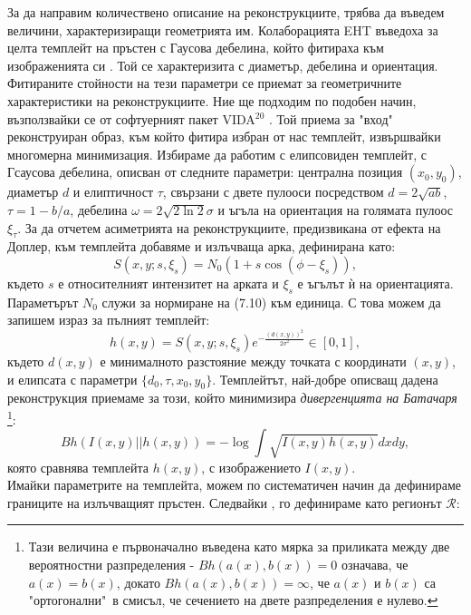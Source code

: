 За да направим количествено описание на реконструкциите, трябва да въведем величини, характеризиращи геометрията им. Колаборацията EHT въведоха за целта темплейт на пръстен с Гаусова дебелина, който фитираха към изображенията си \cite{EHT_M87_VI}. Той се характеризита с диаметър, дебелина и ориентация. Фитираните стойности на тези параметри се приемат за геометричните характеристики на реконструкциите. Ние ще подходим по подобен начин, възползвайки се от софтуерният пакет VIDA$^{20}$ \cite{VIDA}. Той приема за "вход"$\,$ реконструиран образ, към който фитира избран от нас темплейт, извършвайки многомерна минимизация. Избираме да работим с елипсовиден темплейт, с Гсаусова дебелина, описван от следните параметри: централна позиция $(x_0,y_0)$, диаметър $d$ и елиптичност $\tau$, свързани с двете пулооси посредством $d = 2\sqrt{ab}$, $\tau = 1 - b/a$, дебелина $\mathcal{\omega} = 2\sqrt{2\ln2}\sigma$ и ъгъла на ориентация на голямата пулоос $\xi_\tau$. За да отчетем асиметрията на реконструкциите, предизвикана от ефекта на Доплер, към темплейта добавяме и излъчваща арка, дефинирана като:
\begin{equation}
	S(x,y;s,\xi_s) = N_0(1 + s\cos(\phi - \xi_s)),
\end{equation}
където $s$ е относителният интензитет на арката и $\xi_s$ е ъгълът ѝ на ориентацията. Параметърът $N_0$ служи за нормиране на (7.10) към единица. С това можем да запишем израз за пълният темплейт:
\begin{equation}
	h(x,y) = S(x,y;s,\xi_s)e^{-\frac{(d(x,y))^2}{2\sigma^2}}\in[0,1],
\end{equation}
където $d(x,y)$ е минималното разстояние между точката с координати $(x,y)$, и елипсата с параметри $\{d_0,\tau,x_0,y_0\}$. Темплейтът, най-добре описващ дадена реконструкция приемаме за този, който минимизира \emph{дивергенцията на Батачаря} \footnote{Тази величина е първоначално въведена като мярка за приликата между две вероятностни разпределения - $Bh(a(x),b(x)) = 0$ означава, че $a(x) = b(x)$, докато $Bh(a(x), b(x)) = \infty$, че $a(x)$ и $b(x)$ са "ортогонални"$\,$ в смисъл, че сечението на двете разпределения е нулево.}:
\begin{equation}
	Bh\left(I(x,y)||h(x,y)\right)= -\log\int\sqrt{I(x,y)h(x,y)}dxdy,
\end{equation}
която сравнява темплейта $h(x,y)$, с изображението $I(x,y)$.\\

Имайки параметрите на темплейта, можем по систематичен начин да дефинираме границите на излъчващият пръстен. Следвайки \cite{Eichhorn2022}, го дефинираме като регионът $\mathcal{R}$:

